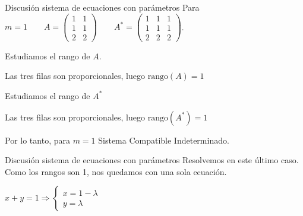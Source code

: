 \documentclass[9pt]{beamer}
\begin{document}
\begin{frame}{Discusión sistema de ecuaciones con parámetros}
Para $m=1 \qquad A=\begin{pmatrix}
1 & 1  \\
1 & 1  \\
2 & 2  
\end{pmatrix} 
\qquad A^*=\begin{pmatrix}
1 & 1 & 1 \\
1 & 1 & 1 \\
2 & 2 & 2 
\end{pmatrix}$.
\pause

Estudiamos el rango de $A$. 
\pause

Las tres filas son proporcionales, luego $\text{rango}(A)=1$
\pause

Estudiamos el rango de $A^*$
\pause

Las tres filas son proporcionales, luego $\text{rango}(A^*)=1$
\pause

Por lo tanto, para $m=1$ Sistema Compatible Indeterminado.
\end{frame}

\begin{frame}{Discusión sistema de ecuaciones con parámetros}
Resolvemos en este último caso.
\pause
Como los rangos son 1, nos quedamos con una sola ecuación.

$x+y=1 \Rightarrow \left\lbrace \begin{array}{l}
x= 1- \lambda \\
y= \lambda 
\end{array} \right.$
\pause

\end{frame}
\end{document}
